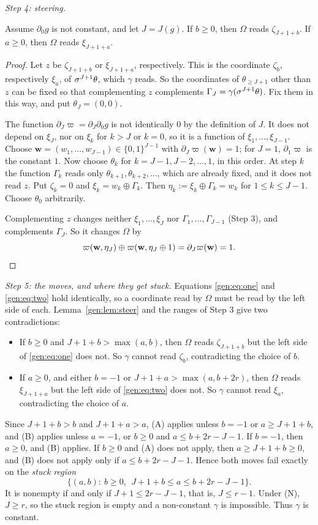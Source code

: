 \emph{Step 4: steering.}
\begin{lemma}\label{gen:lem:steer}
Assume $\partial_0g$ is not constant, and let $J=J(g)$. If $b\ge0$, then $\Omega$ reads $\zeta_{J+1+b}$. If $a\ge0$, then $\Omega$ reads $\xi_{J+1+a}$.
\end{lemma}

\begin{proof}
Let $z$ be $\zeta_{J+1+b}$ or $\xi_{J+1+a}$, respectively. This is the coordinate $\zeta_b$, respectively $\xi_a$, of $\sigma^{J+1}\theta$, which $\gamma$ reads. So the coordinates of $\theta_{\ge J+1}$ other than $z$ can be fixed so that complementing $z$ complements $\Gamma_J=\gamma(\sigma^{J+1}\theta)$. Fix them in this way, and put $\theta_J=(0,0)$.

The function $\partial_J\varpi=\partial_J\partial_0g$ is not identically $0$ by the definition of $J$. It does not depend on $\xi_J$, nor on $\xi_k$ for $k>J$ or $k=0$, so it is a function of $\xi_1,\dots,\xi_{J-1}$. Choose $\mathbf w=(w_1,\dots,w_{J-1})\in\{0,1\}^{J-1}$ with $\partial_J\varpi(\mathbf w)=1$; for $J=1$, $\partial_1\varpi$ is the constant $1$. Now choose $\theta_k$ for $k=J-1,J-2,\dots,1$, in this order. At step $k$ the function $\Gamma_k$ reads only $\theta_{k+1},\theta_{k+2},\dots$, which are already fixed, and it does not read $z$. Put $\zeta_k=0$ and $\xi_k=w_k\oplus\Gamma_k$. Then $\eta_k:=\xi_k\oplus\Gamma_k=w_k$ for $1\le k\le J-1$. Choose $\theta_0$ arbitrarily.

Complementing $z$ changes neither $\xi_1,\dots,\xi_J$ nor $\Gamma_1,\dots,\Gamma_{J-1}$ (Step 3), and complements $\Gamma_J$. So it changes $\Omega$ by
\[
\varpi(\mathbf w,\eta_J)\oplus\varpi(\mathbf w,\eta_J\oplus1)=\partial_J\varpi(\mathbf w)=1.\qedhere
\]
\end{proof}

\emph{Step 5: the moves, and where they get stuck.} Equations \eqref{gen:eq:one} and \eqref{gen:eq:two} hold identically, so a coordinate read by $\Omega$ must be read by the left side of each. Lemma~\ref{gen:lem:steer} and the ranges of Step 3 give two contradictions:
\begin{itemize}
\item[(A)] If $b\ge0$ and $J+1+b>\max(a,b)$, then $\Omega$ reads $\zeta_{J+1+b}$ but the left side of \eqref{gen:eq:one} does not. So $\gamma$ cannot read $\zeta_b$, contradicting the choice of $b$.
\item[(B)] If $a\ge0$, and either $b=-1$ or $J+1+a>\max(a,b+2r)$, then $\Omega$ reads $\xi_{J+1+a}$ but the left side of \eqref{gen:eq:two} does not. So $\gamma$ cannot read $\xi_a$, contradicting the choice of $a$.
\end{itemize}
Since $J+1+b>b$ and $J+1+a>a$, (A) applies unless $b=-1$ or $a\ge J+1+b$, and (B) applies unless $a=-1$, or $b\ge0$ and $a\le b+2r-J-1$. If $b=-1$, then $a\ge0$, and (B) applies. If $b\ge0$ and (A) does not apply, then $a\ge J+1+b\ge0$, and (B) does not apply only if $a\le b+2r-J-1$. Hence both moves fail exactly on the \emph{stuck region}
\[
\bigl\{(a,b):\ b\ge0,\ \ J+1+b\le a\le b+2r-J-1\bigr\}.
\]
It is nonempty if and only if $J+1\le2r-J-1$, that is, $J\le r-1$. Under (N), $J\ge r$, so the stuck region is empty and a non-constant $\gamma$ is impossible. Thus $\gamma$ is constant.


